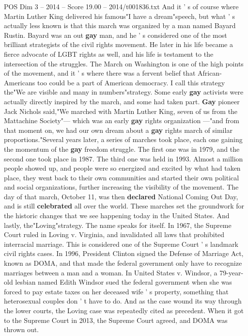 \begin{textsample}{POS Dim 3 – 2014 – Score 19.00 – 2014/t001836.txt}
And it ' s of course where Martin Luther King delivered his famous"I have a dream"speech, but what ' s actually less known is that this march was organized by a man named Bayard Rustin.
Bayard was an out \textbf{gay} man, and he ' s considered one of the most brilliant strategists of the civil rights movement.
He later in his life became a fierce advocate of LGBT rights as well, and his life is testament to the intersection of the struggles.
The March on Washington is one of the high points of the movement, and it ' s where there was a fervent belief that African- Americans too could be a part of American democracy.
I call this strategy the"We are visible and many in numbers"strategy.
Some early \textbf{gay} activists were actually directly inspired by the march, and some had taken part. \textbf{Gay} pioneer Jack Nichols said,"We marched with Martin Luther King, seven of us from the Mattachine Society"— which was an early \textbf{gay} rights organization —"and from that moment on, we had our own dream about a \textbf{gay} rights march of similar proportions."Several years later, a series of marches took place, each one gaining the momentum of the \textbf{gay} freedom struggle.
The first one was in 1979, and the second one took place in 1987.
The third one was held in 1993.
Almost a million people showed up, and people were so energized and excited by what had taken place, they went back to their own communities and started their own political and social organizations, further increasing the visibility of the movement.
The day of that march, October 11, was then \textbf{declared} National Coming Out Day, and is still \textbf{celebrated} all over the world.
These marches set the groundwork for the historic changes that we see happening today in the United States.
And lastly, the"Loving"strategy.
The name speaks for itself.
In 1967, the Supreme Court ruled in Loving v.
Virginia, and invalidated all laws that prohibited interracial marriage.
This is considered one of the Supreme Court ' s landmark civil rights cases.
In 1996, President Clinton signed the Defense of Marriage Act, known as DOMA, and that made the federal government only have to recognize marriages between a man and a woman.
In United States v.
Windsor, a 79-year-old lesbian named Edith Windsor sued the federal government when she was forced to pay estate taxes on her deceased wife ' s property, something that heterosexual couples don ' t have to do.
And as the case wound its way through the lower courts, the Loving case was repeatedly cited as precedent.
When it got to the Supreme Court in 2013, the Supreme Court agreed, and DOMA was thrown out.

\end{textsample}
